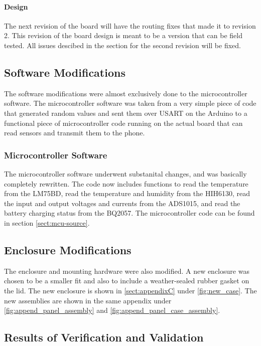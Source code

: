 \documentclass{article}
\numberwithin{figure}{section}
\numberwithin{equation}{section}
\begin{document}
{\paragraph{Design}
The next revision of the board will have the routing fixes that made it to revision 2. This revision of the board design is meant to be a version that can be field tested. All issues descibed in the section for the second revision will be fixed.
\subsection{Software Modifications}\label{conclusion-software}
The software modifications were almost exclusively done to the microcontroller software. The microcontroller software was taken from a very simple piece of code that generated random values and sent them over USART on the Arduino to a functional piece of microcontroller code running on the actual board that can read sensors and transmit them to the phone.
\subsubsection{Microcontroller Software}\label{conclusion-mcu-software}
The microcontroller software underwent substanital changes, and was basically completely rewritten. The code now includes functions to read the temperature from the LM75BD, read the temperature and humidity from the HIH6130, read the input and output voltages and currents from the ADS1015, and read the battery charging status from the BQ2057. The microcontroller code can be found in section \ref{sect:mcu-source}.

\subsection{Enclosure Modifications}\label{conclusion-enclosure}
The enclosure and mounting hardware were also modified. A new enclosure was chosen to be a smaller fit and also to include a weather-sealed rubber gasket on the lid. The new enclosure is shown in \ref{sect:appendixC} under \ref{fig:new_case}. The new assemblies are shown in the same appendix under \ref{fig:append_panel_assembly} and \ref{fig:append_panel_case_assembly}.

\subsection{Results of Verification and Validation}\label{conclusion-vv}

}
\end{document}

